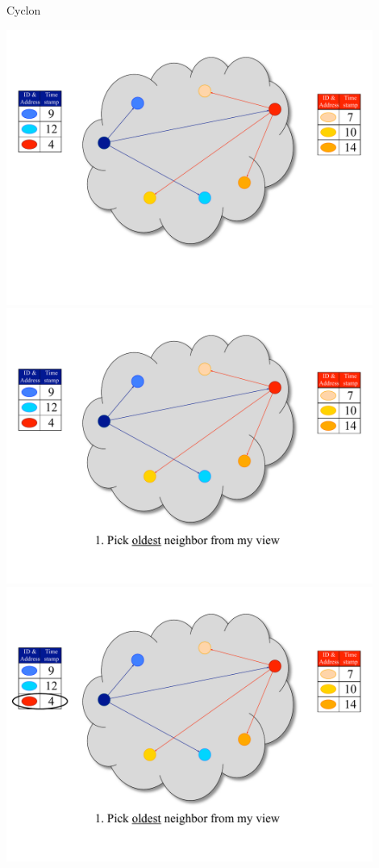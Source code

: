 \begin{frame}{Cyclon}
	
\begin{overprint}
\includegraphics[width=0.9\textwidth]{figs/11/1_cyclon}
\includegraphics[width=0.9\textwidth]{figs/11/2_cyclon}
\includegraphics[width=0.9\textwidth]{figs/11/3_cyclon}

\end{overprint}
\end{frame}
